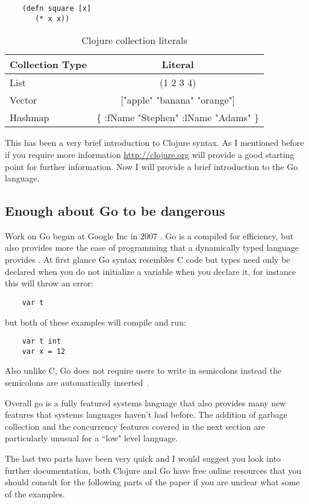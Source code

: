 \documentclass{acm_proc_article-sp}
\begin{document}
	\begin{verbatim}
	(defn square [x]
	   (* x x))
	\end{verbatim}
	
	\begin{table}[t]
	\caption{Clojure collection literals\label{coll:table}}	
	\begin{tabular}{ | l | c | }
	\hline
	Collection Type & Literal \\ \hline
	List & (1 2 3 4) \\ \hline
	Vector & ["apple" "banana" "orange"] \\ \hline
	Hashmap & \{ :fName "Stephen" :lName "Adams" \}\\
	\hline
	\end{tabular}
	\end{table}
	
	This has been a very brief introduction to Clojure syntax. As I mentioned before if you require more information \url{http://clojure.org} will provide a good starting point for further information. Now I will provide a brief introduction to the Go language.
	\subsection{Enough about Go to be dangerous}
	Work on Go began at Google Inc in 2007 \cite{wiki:go}. Go is a compiled for efficiency, but also provides more the ease of programming that a dynamically typed language provides \cite{wiki:go}. At first glance Go syntax resembles C code but types need only be declared when you do not initialize a variable when you declare it, for instance this will throw an error:
	
	\begin{verbatim}
	var t
	\end{verbatim}
	but both of these examples will compile and run:
	\begin{verbatim}
	var t int
	var x = 12
	\end{verbatim}
	Also unlike C, Go does not require users to write in semicolons instead the semicolons are automatically inserted~\cite{go:effective}.
	
	Overall go is a fully featured systems language that also provides many new features that systems languages haven't had before. The addition of garbage collection and the concurrency features covered in the next section are particularly unusual for a ``low" level language.
	
	The last two parts have been very quick and I would suggest you look into further documentation, both Clojure and Go have free online resources that you should consult for the following parts of the paper if you are unclear what some of the examples.
	
\end{document}
